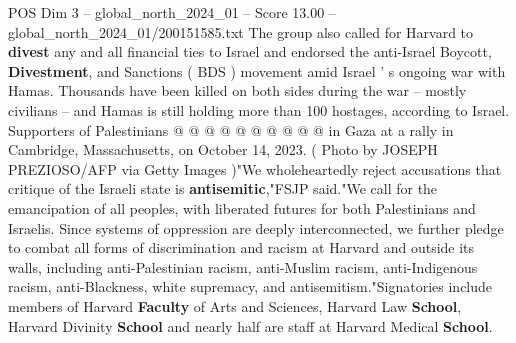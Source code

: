 \begin{textsample}{POS Dim 3 – global\_north\_2024\_01 – Score 13.00 – global\_north\_2024\_01/200151585.txt}
The group also called for Harvard to \textbf{divest} any and all financial ties to Israel and endorsed the anti-Israel Boycott, \textbf{Divestment}, and Sanctions ( BDS ) movement amid Israel ' s ongoing war with Hamas.
Thousands have been killed on both sides during the war -- mostly civilians -- and Hamas is still holding more than 100 hostages, according to Israel.
Supporters of Palestinians @ @ @ @ @ @ @ @ @ @ in Gaza at a rally in Cambridge, Massachusetts, on October 14, 2023. ( Photo by JOSEPH PREZIOSO/AFP via Getty Images )"We wholeheartedly reject accusations that critique of the Israeli state is \textbf{antisemitic},"FSJP said."We call for the emancipation of all peoples, with liberated futures for both Palestinians and Israelis.
Since systems of oppression are deeply interconnected, we further pledge to combat all forms of discrimination and racism at Harvard and outside its walls, including anti-Palestinian racism, anti-Muslim racism, anti-Indigenous racism, anti-Blackness, white supremacy, and antisemitism."Signatories include members of Harvard \textbf{Faculty} of Arts and Sciences, Harvard Law \textbf{School}, Harvard Divinity \textbf{School} and nearly half are staff at Harvard Medical \textbf{School}.

\end{textsample}
